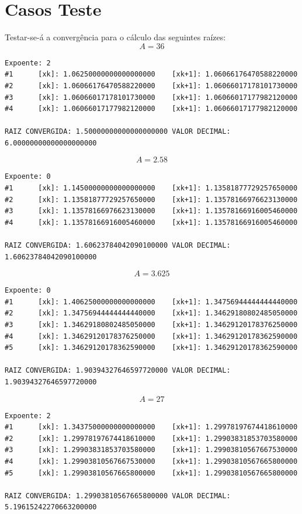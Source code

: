 	\section{Casos Teste}
	Testar-se-á a convergência para o cálculo das seguintes raízes:
	$$A = 36$$
	\begin{Verbatim}[fontsize=\footnotesize]
Expoente: 2
#1      [xk]: 1.06250000000000000000    [xk+1]: 1.06066176470588220000
#2      [xk]: 1.06066176470588220000    [xk+1]: 1.06066017178101730000
#3      [xk]: 1.06066017178101730000    [xk+1]: 1.06066017177982120000
#4      [xk]: 1.06066017177982120000    [xk+1]: 1.06066017177982120000

RAIZ CONVERGIDA: 1.50000000000000000000 VALOR DECIMAL: 6.00000000000000000000
	\end{Verbatim}
	$$A = 2.58$$
	\begin{Verbatim}[fontsize=\footnotesize]
Expoente: 0
#1      [xk]: 1.14500000000000000000    [xk+1]: 1.13581877729257650000
#2      [xk]: 1.13581877729257650000    [xk+1]: 1.13578166976623130000
#3      [xk]: 1.13578166976623130000    [xk+1]: 1.13578166916005460000
#4      [xk]: 1.13578166916005460000    [xk+1]: 1.13578166916005460000

RAIZ CONVERGIDA: 1.60623784042090100000 VALOR DECIMAL: 1.60623784042090100000
	\end{Verbatim}
	$$A = 3.625$$
	\begin{Verbatim}[fontsize=\footnotesize]
Expoente: 0
#1      [xk]: 1.40625000000000000000    [xk+1]: 1.34756944444444440000
#2      [xk]: 1.34756944444444440000    [xk+1]: 1.34629180802485050000
#3      [xk]: 1.34629180802485050000    [xk+1]: 1.34629120178376250000
#4      [xk]: 1.34629120178376250000    [xk+1]: 1.34629120178362590000
#5      [xk]: 1.34629120178362590000    [xk+1]: 1.34629120178362590000

RAIZ CONVERGIDA: 1.90394327646597720000 VALOR DECIMAL: 1.90394327646597720000
	\end{Verbatim}
	$$A = 27$$
	\begin{Verbatim}[fontsize=\footnotesize]
Expoente: 2
#1      [xk]: 1.34375000000000000000    [xk+1]: 1.29978197674418610000
#2      [xk]: 1.29978197674418610000    [xk+1]: 1.29903831853703580000
#3      [xk]: 1.29903831853703580000    [xk+1]: 1.29903810567667530000
#4      [xk]: 1.29903810567667530000    [xk+1]: 1.29903810567665800000
#5      [xk]: 1.29903810567665800000    [xk+1]: 1.29903810567665800000

RAIZ CONVERGIDA: 1.29903810567665800000 VALOR DECIMAL: 5.19615242270663200000
	\end{Verbatim}
